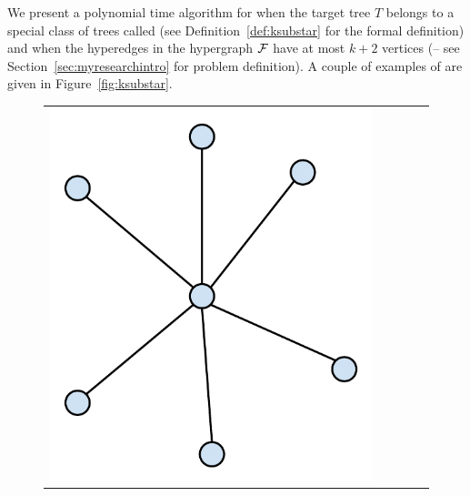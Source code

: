 We present a polynomial time algorithm for {\CFTPL} when the target
tree $T$ belongs to a special class of trees called {\em \kstars} (see
Definition~\ref{def:ksubstar} for the formal definition) and
when the hyperedges in the hypergraph ${\cal F}$ have at most $k+2$
vertices (\CFTPLKTREE -- see Section~\ref{sec:myresearchintro} for
problem definition). A couple of examples of {\kstars} are given in
Figure~\ref{fig:ksubstar}.


\begin{figure}[t]
  \centering
  \begin{tabular}[h]{ccccc}
    \includegraphics[scale=0.3]{../img/star.pdf} &&&&

\end{tabular}
\end{figure}
